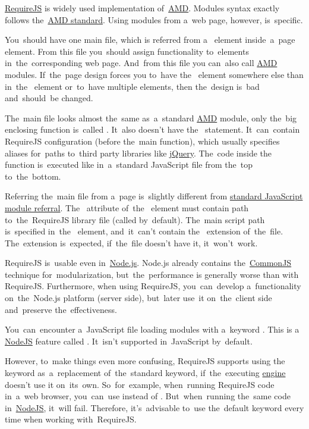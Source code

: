 \label{requirejs}
\href{https://requirejs.org}{RequireJS} is widely used implementation of~\hyperref[amd]{AMD}.
Modules syntax exactly follows the~\hyperref[amdsyntax]{AMD standard}.
Using modules from a~web page, however, is~specific.

You~should have one main file, which is referred from a~ element inside~a~page  element.
From this file you~should assign functionality to~elements in~the~corresponding web page.
And~from this file you can~also call \hyperref[amd]{AMD} modules.
If~the~page design forces you to~have the~ element somewhere else than in~the~ element or~to~have multiple  elements, then the~design is~bad and~should~be changed.

The~main file looks almost the~same as~a~standard \hyperref[amd]{AMD} module, only the~big enclosing function is~called .
It~also doesn't have the~ statement.
It~can~contain RequireJS configuration (before the~main  function), which usually specifies aliases for~paths to~third party libraries like \hyperref[jquery]{jQuery}.
The~code inside the~ function is~executed like in~a~standard JavaScript file from the~top to~the~bottom.

Referring the~main file from a~page is~slightly different from \hyperref[javascriptmodularity]{standard JavaScript module referral}.
The~ attribute of~the~ element must contain path to~the~RequireJS library file (called  by~default).
The~main script path is~specified in~the~ element, and~it~can't contain the~ extension of~the~file.
The~extension is~expected, if~the~file doesn't have it, it~won't~work.

\note RequireJS is~usable even in~\hyperref[nodejs]{Node.js}.
Node.js already contains \mbox{the \hyperref[nodejscommonjs]{CommonJS}} technique for~modularization, but~the~performance is generally worse than with RequireJS\@.
Furthermore, when using RequireJS, you~can~develop a~functionality on~the~Node.js platform (server side), but~later use~it on~the~client side and~preserve the~effectiveness.

\warning You~can~encounter a~JavaScript file loading modules with a~keyword .
This is a \hyperref[nodejs]{NodeJS} feature called \hyperref[nodejscommonjs]{}.
It~isn't supported in~JavaScript by~default.

However, to~make things even more confusing, RequireJS supports using the~ keyword as~a~replacement of~the~standard  keyword, if~the~executing \hyperref[engine]{engine} doesn't use it on~its~own.
So~for~example, when~running RequireJS code in~a~web browser, you~can~use  instead of .
But~when~running the~same code in~\hyperref[nodejs]{NodeJS}, it~will fail.
Therefore, it's~advisable to~use the~default  keyword every time when working with~RequireJS.
\newpage

